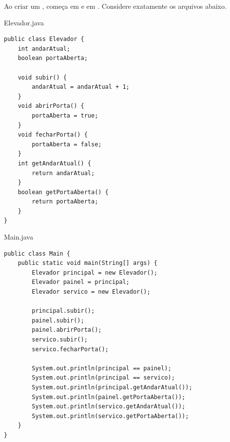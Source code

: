 \documentclass[11pt,a4paper]{article}
\begin{document}
\cabecalhoAvaliacao
\blocoQuadroRespostas
{}
Ao criar um ,  começa em  e
 em . Considere exatamente os arquivos abaixo.

\noindent\begin{minipage}[t]{.37\textwidth}
\begin{painelreferencia}{Elevador.java}
\begin{lstlisting}[style=cenariocodigo]
public class Elevador {
    int andarAtual;
    boolean portaAberta;

    void subir() {
        andarAtual = andarAtual + 1;
    }
    void abrirPorta() {
        portaAberta = true;
    }
    void fecharPorta() {
        portaAberta = false;
    }
    int getAndarAtual() {
        return andarAtual;
    }
    boolean getPortaAberta() {
        return portaAberta;
    }
}
\end{lstlisting}
\end{painelreferencia}
\end{minipage}\hfill
\begin{minipage}[t]{.61\textwidth}
\begin{painelreferencia}{Main.java}
\begin{lstlisting}[style=cenariocodigo]
public class Main {
    public static void main(String[] args) {
        Elevador principal = new Elevador();
        Elevador painel = principal;
        Elevador servico = new Elevador();

        principal.subir();
        painel.subir();
        painel.abrirPorta();
        servico.subir();
        servico.fecharPorta();

        System.out.println(principal == painel);
        System.out.println(principal == servico);
        System.out.println(principal.getAndarAtual());
        System.out.println(painel.getPortaAberta());
        System.out.println(servico.getAndarAtual());
        System.out.println(servico.getPortaAberta());
    }
}
\end{lstlisting}
\end{painelreferencia}
\end{minipage}
\inicioQuestoes

\end{document}
